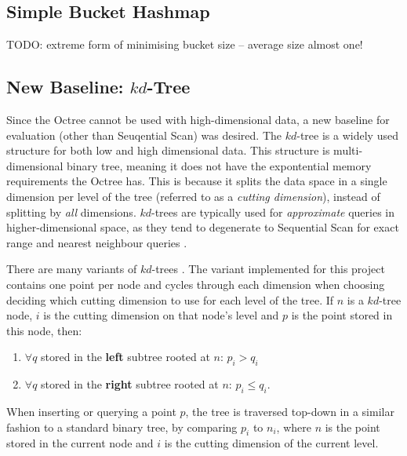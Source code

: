\subsection{Simple Bucket Hashmap}

TODO: extreme form of minimising bucket size -- average size almost one!

\subsection{New Baseline: $kd$-Tree}

Since the Octree cannot be used with high-dimensional data, a new baseline for evaluation (other than Seuqential Scan) was desired. The $kd$-tree is a widely used structure for both low and high dimensional data. This structure is multi-dimensional binary tree, meaning it does not have the expontential memory requirements the Octree has. This is because it splits the data space in a single dimension per level of the tree (referred to as a \textit{cutting dimension}), instead of splitting by \textit{all} dimensions. $kd$-trees are typically used for \textit{approximate} queries in higher-dimensional space, as they tend to degenerate to Sequential Scan for exact range and nearest neighbour queries \cite{similarity-searching}.

There are many variants of $kd$-trees \cite{kd-tree, bkd-tree, kdb-tree}. The variant implemented for this project contains one point per node and cycles through each dimension when choosing deciding which cutting dimension to use for each level of the tree. If $n$ is a $kd$-tree node, $i$ is the cutting dimension on that node's level and $p$ is the point stored in this node, then:
\begin{enumerate}
	\item $\forall q$ stored in the \textbf{left} subtree rooted at $n$: $p_i > q_i$ 
	\item $\forall q$ stored in the \textbf{right} subtree rooted at $n$: $p_i \leq q_i$.
\end{enumerate}
When inserting or querying a point $p$, the tree is traversed top-down in a similar fashion to a standard binary tree, by comparing $p_i$ to $n_i$, where $n$ is the point stored in the current node and $i$ is the cutting dimension of the current level.

